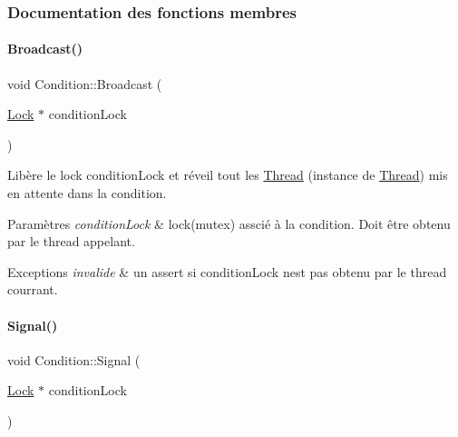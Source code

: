 \subsubsection{Documentation des fonctions membres}
\hypertarget{class_condition_aefae94b3f9be40a09df667e63a4bdab7}{}\label{class_condition_aefae94b3f9be40a09df667e63a4bdab7} 
\paragraph{\texorpdfstring{Broadcast()}{Broadcast()}}
{\footnotesize\ttfamily void Condition\+::\+Broadcast (\begin{DoxyParamCaption}\item[{\hyperlink{class_lock}{Lock} $\ast$}]{condition\+Lock }\end{DoxyParamCaption})}



Libère le lock condition\+Lock et réveil tout les \hyperlink{class_thread}{Thread} (instance de \hyperlink{class_thread}{Thread}) mis en attente dans la condition. 


\begin{DoxyParams}{Paramètres}
{\em condition\+Lock} & lock(mutex) asscié à la condition. Doit être obtenu par le thread appelant. \\
\hline
\end{DoxyParams}

\begin{DoxyExceptions}{Exceptions}
{\em invalide} & un assert si condition\+Lock n\textquotesingle{}est pas obtenu par le thread courrant. \\
\hline
\end{DoxyExceptions}
\hypertarget{class_condition_ada25a70d161b7dc9b81eaad0ef66d91c}{}\label{class_condition_ada25a70d161b7dc9b81eaad0ef66d91c} 
\paragraph{\texorpdfstring{Signal()}{Signal()}}
{\footnotesize\ttfamily void Condition\+::\+Signal (\begin{DoxyParamCaption}\item[{\hyperlink{class_lock}{Lock} $\ast$}]{condition\+Lock }\end{DoxyParamCaption})}



